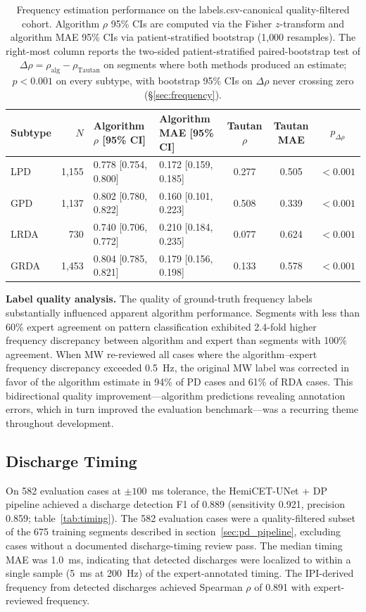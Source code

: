 \documentclass{iopjournal}
\begin{document}
\begin{table}[t]
\caption{Frequency estimation performance on the labels.csv-canonical quality-filtered cohort. Algorithm $\rho$ 95\% CIs are computed via the Fisher $z$-transform and algorithm MAE 95\% CIs via patient-stratified bootstrap (1{,}000 resamples). The right-most column reports the two-sided patient-stratified paired-bootstrap test of $\Delta\rho = \rho_\mathrm{alg}-\rho_\mathrm{Tautan}$ on segments where both methods produced an estimate; $p<0.001$ on every subtype, with bootstrap 95\% CIs on $\Delta\rho$ never crossing zero (\S\ref{sec:frequency}).}
\centering
\small
\begin{tabular}{l r l l c c c}
\hline
Subtype & $N$ & Algorithm $\rho$ [95\% CI] & Algorithm MAE [95\% CI] & Tautan $\rho$ & Tautan MAE & $p_{\Delta\rho}$ \\
\hline
LPD  & 1{,}155 & 0.778 [0.754, 0.800] & 0.172 [0.159, 0.185] & 0.277 & 0.505 & $<\!0.001$ \\
GPD  & 1{,}137 & 0.802 [0.780, 0.822] & 0.160 [0.101, 0.223] & 0.508 & 0.339 & $<\!0.001$ \\
LRDA & 730     & 0.740 [0.706, 0.772] & 0.210 [0.184, 0.235] & 0.077 & 0.624 & $<\!0.001$ \\
GRDA & 1{,}453 & 0.804 [0.785, 0.821] & 0.179 [0.156, 0.198] & 0.133 & 0.578 & $<\!0.001$ \\
\hline
\end{tabular}
\label{tab:frequency}
\end{table}

\textbf{Label quality analysis.} The quality of ground-truth frequency labels substantially influenced apparent algorithm performance. Segments with less than 60\% expert agreement on pattern classification exhibited 2.4-fold higher frequency discrepancy between algorithm and expert than segments with 100\% agreement. When MW re-reviewed all cases where the algorithm--expert frequency discrepancy exceeded 0.5~Hz, the original MW label was corrected in favor of the algorithm estimate in 94\% of PD cases and 61\% of RDA cases. This bidirectional quality improvement---algorithm predictions revealing annotation errors, which in turn improved the evaluation benchmark---was a recurring theme throughout development.

\subsection{Discharge Timing}
\label{sec:timing}

On 582 evaluation cases at $\pm 100$~ms tolerance, the HemiCET-UNet + DP pipeline achieved a discharge detection F1 of 0.889 (sensitivity 0.921, precision 0.859; table~\ref{tab:timing}). The 582 evaluation cases were a quality-filtered subset of the 675 training segments described in section~\ref{sec:pd_pipeline}, excluding cases without a documented discharge-timing review pass. The median timing MAE was 1.0~ms, indicating that detected discharges were localized to within a single sample (5~ms at 200~Hz) of the expert-annotated timing. The IPI-derived frequency from detected discharges achieved Spearman $\rho$ of 0.891 with expert-reviewed frequency.
\end{document}
